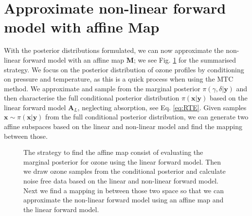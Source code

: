 \section{Approximate non-linear forward model with affine Map} 
\label{sec:affineMap}
With the posterior distributions formulated, we can now approximate the non-linear forward model with an affine map $\bm{M}$; we see Fig. \ref{fig:affinStrat} for the summarised strategy.
We focus on the posterior distribution of ozone profiles by conditioning on pressure and temperature, as this is a quick process when using the MTC method.
We approximate and sample from the marginal posterior $ \pi(\gamma , \delta|\bm{y})$ and then characterise the full conditional posterior distribution $\pi(\bm{x}|\bm{y})$ based on the linear forward model $\bm{A}_L$, neglecting absorption, see Eq. \ref{eq:RTE}.
Given samples $\bm{x} \sim \pi(\bm{x}|\bm{y})$ from the full conditional posterior distribution, we can generate two affine subspaces based on the linear and non-linear model and find the mapping between those.

\begin{figure}[htb!]
	\centering
	\caption[Strategy to find affine map.]{The strategy to find the affine map consist of evaluating the marginal posterior for ozone using the linear forward model. Then we draw ozone samples from the conditional posterior and calculate noise free data based on the linear and non-linear forward model. Next we find a mapping in between those two space so that we can approximate the non-linear forward model using an affine map and the linear forward model.}
	\label{fig:affinStrat}
\end{figure}


